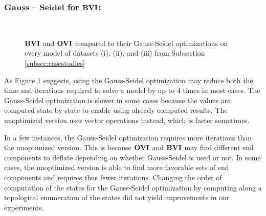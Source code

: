 \subsubsection*{\underline{$\mathbf{Gauss-Seidel}$ for $\mathbf{BVI}$}:}
\begin{figure}[h!]
    \centering
    \
    \caption{$\mathbf{BVI}$ and $\mathbf{OVI}$ compared to their Gauss-Seidel optimizations on every model of datasets (i), (ii), and (iii) from Subsection \ref{subsec:casestudies}}%
    \label{fig:Scatter_G}%
    \end{figure}

As Figure \ref{fig:Scatter_G} suggests, using the Gauss-Seidel optimization may reduce both the time and iterations required to solve a model by up to 4 times in most cases.
The Gauss-Seidel optimization is slower in some cases because the values are computed state by state to enable using already computed results.
The unoptimized version uses vector operations instead, which is faster sometimes.

In a few instances, the Gauss-Seidel optimization requires more iterations than the unoptimized version. 
This is because $\mathbf{OVI}$ and $\mathbf{BVI}$ may find different end components to deflate depending on whether Gauss-Seidel is used or not.
In some cases, the unoptimized version is able to find more favorable sets of end components and requires thus fewer iterations.
Changing the order of computation of the states for the Gauss-Seidel optimization by computing along a topological enumeration of the states did not
yield improvements in our experiments. 
\FloatBarrier 


